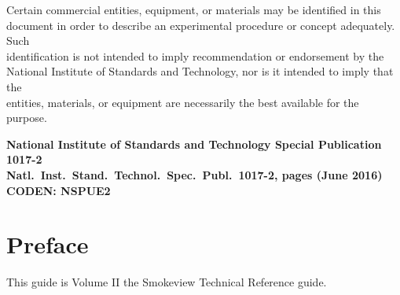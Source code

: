 \documentclass[11pt,twoside]{book}
\begin{document}
\date{}
\title{\ttitle}
\author{Glenn P. Forney}


\setlength{\parindent}{0.25in}

\newpage

\begin{minipage}[t][9in][s]{6.5in}

\begin{flushright}
Certain commercial entities, equipment, or materials may be identified in this \\
document in order to describe an experimental procedure or concept adequately. Such \\
identification is not intended to imply recommendation or endorsement by the \\
National Institute of Standards and Technology, nor is it intended to imply that the \\
entities, materials, or equipment are necessarily the best available for the purpose.
\end{flushright}

\vspace{3in}

\large
\begin{flushright}
\bf National Institute of Standards and Technology Special Publication 1017-2\\
Natl.~Inst.~Stand.~Technol.~Spec.~Publ.~1017-2, \pageref{LastPage} pages (June 2016) \\
CODEN: NSPUE2
\end{flushright}

\vfill

\end{minipage}


\frontmatter
\pagestyle{plain}

%
%

\chapter{Preface}
\smvoverview
This guide is Volume II the Smokeview Technical Reference guide.
\end{document}
